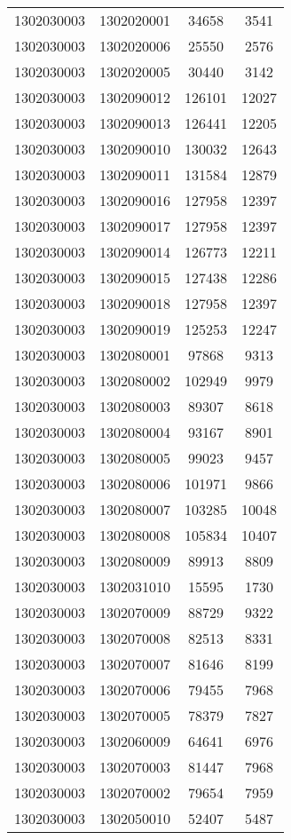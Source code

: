 \begin{longtable}[h]{llcc}
		1302030003 & 1302020001 & 34658 & 3541\\
		1302030003 & 1302020006 & 25550 & 2576\\
		1302030003 & 1302020005 & 30440 & 3142\\
		1302030003 & 1302090012 & 126101 & 12027\\
		1302030003 & 1302090013 & 126441 & 12205\\
		1302030003 & 1302090010 & 130032 & 12643\\
		1302030003 & 1302090011 & 131584 & 12879\\
		1302030003 & 1302090016 & 127958 & 12397\\
		1302030003 & 1302090017 & 127958 & 12397\\
		1302030003 & 1302090014 & 126773 & 12211\\
		1302030003 & 1302090015 & 127438 & 12286\\
		1302030003 & 1302090018 & 127958 & 12397\\
		1302030003 & 1302090019 & 125253 & 12247\\
		1302030003 & 1302080001 & 97868 & 9313\\
		1302030003 & 1302080002 & 102949 & 9979\\
		1302030003 & 1302080003 & 89307 & 8618\\
		1302030003 & 1302080004 & 93167 & 8901\\
		1302030003 & 1302080005 & 99023 & 9457\\
		1302030003 & 1302080006 & 101971 & 9866\\
		1302030003 & 1302080007 & 103285 & 10048\\
		1302030003 & 1302080008 & 105834 & 10407\\
		1302030003 & 1302080009 & 89913 & 8809\\
		1302030003 & 1302031010 & 15595 & 1730\\
		1302030003 & 1302070009 & 88729 & 9322\\
		1302030003 & 1302070008 & 82513 & 8331\\
		1302030003 & 1302070007 & 81646 & 8199\\
		1302030003 & 1302070006 & 79455 & 7968\\
		1302030003 & 1302070005 & 78379 & 7827\\
		1302030003 & 1302060009 & 64641 & 6976\\
		1302030003 & 1302070003 & 81447 & 7968\\
		1302030003 & 1302070002 & 79654 & 7959\\
		1302030003 & 1302050010 & 52407 & 5487\\

\end{longtable}
